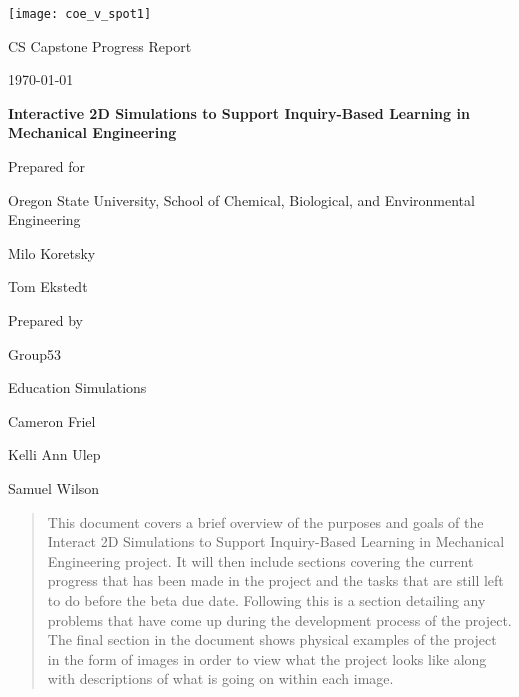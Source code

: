 \documentclass[onecolumn, draftclsnofoot,10pt, compsoc]{IEEEtran}
\def \CapstoneTeamName{Education Simulations}
\def \CapstoneTeamNumber{53}
\def \GroupMemberOne{Cameron Friel}
\def \GroupMemberTwo{Kelli Ann Ulep}
\def \GroupMemberThree{Samuel Wilson}
\def \CapstoneProjectName{Interactive 2D Simulations to Support Inquiry-Based Learning in Mechanical Engineering}
\def \CapstoneSponsorCompany{Oregon State University, School of Chemical, Biological, and Environmental Engineering}
\def \CapstoneSponsorPersonOne{Milo Koretsky}
\def \CapstoneSponsorPersonTwo{Tom Ekstedt}
\def \DocType{		%
				Progress Report
				}
\newcommand{\NameSigPair}[1]{\par
\makebox[2.75in][r]{#1} \hfil 	\makebox[3.25in]{\makebox[2.25in]{\hrulefill} \hfill		\makebox[.75in]{\hrulefill}}
\par\vspace{-12pt} \textit{\tiny\noindent
\makebox[2.75in]{} \hfil		\makebox[3.25in]{\makebox[2.25in][r]{Signature} \hfill	\makebox[.75in][r]{Date}}}}
\renewcommand{\NameSigPair}[1]{#1}
\begin{document}
\begin{titlepage}
    \begin{singlespace}
    	\texttt{[image: coe\_v\_spot1]}
        \hfill 
        \par\vspace{.2in}
        \centering
        \scshape{
            \huge CS Capstone \DocType \par
            {\large\today}\par
            \vspace{.5in}
            \textbf{\Huge\CapstoneProjectName}\par
            \vfill
            {\large Prepared for}\par
            \Huge \CapstoneSponsorCompany\par
            \vspace{5pt}
            {\Large
                \NameSigPair{\CapstoneSponsorPersonOne}\par
                \NameSigPair{\CapstoneSponsorPersonTwo}\par
            }
            {\large Prepared by }\par
            Group\CapstoneTeamNumber\par
            \CapstoneTeamName\par 
            \vspace{5pt}
            {\Large
                \NameSigPair{\GroupMemberOne}\par
                \NameSigPair{\GroupMemberTwo}\par
                \NameSigPair{\GroupMemberThree}\par
            }
            \vspace{20pt}
        }
        \begin{abstract}
         This document covers a brief overview of the purposes and goals of the Interact 2D Simulations to Support Inquiry-Based Learning in Mechanical Engineering project. It will then include sections covering the current progress that has been made in the project and the tasks that are still left to do before the beta due date. Following this is a section detailing any problems that have come up during the development process of the project. The final section in the document shows physical examples of the project in the form of images in order to view what the project looks like along with descriptions of what is going on within each image. 

        \end{abstract}     
    \end{singlespace}
\end{titlepage}
\newpage
{}
\tableofcontents
\clearpage
\end{document}
